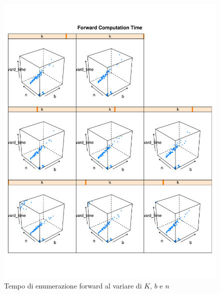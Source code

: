 \documentclass{llncs}
\begin{document}
\begin{figure}[!h]
  \centering
  \includegraphics[width=12cm]{img/graph_all-time_by_nbk_fw.pdf}
  \caption{Tempo di enumerazione forward al variare di $K$, $b$ e $n$}
  \label{fig:time_by_nbk_fw}

\end{figure}



\newpage


\end{document}
